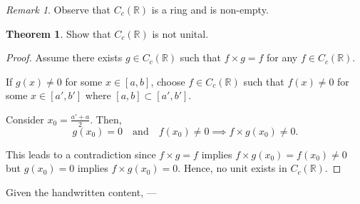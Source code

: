 \documentclass[11pt]{article}
\theoremstyle{definition}
\newtheorem{theorem}{Theorem}[section]
\theoremstyle{remark}
\newtheorem{remark}{Remark}[section]
\begin{document}
\begin{remark}\label{rem:ring}
Observe that $C_c(\mathbb{R})$ is a ring and is non-empty.
\end{remark}

\begin{theorem}\label{thm:nonunit}
Show that $C_c(\mathbb{R})$ is not unital.
\end{theorem}

\begin{proof}
Assume there exists $g \in C_c(\mathbb{R})$ such that $f \times g = f$ for any $f \in C_c(\mathbb{R})$.

If $g(x) \neq 0$ for some $x \in [a, b]$, choose $f \in C_c(\mathbb{R})$ such that $f(x) \neq 0$ for some $x \in [a', b']$ where $[a, b] \subset [a', b']$.

Consider $x_0 = \frac{a' + a}{2}$. Then,
\[
g(x_0) = 0 \quad \text{and} \quad f(x_0) \neq 0 \implies f \times g(x_0) \neq 0.
\]

This leads to a contradiction since $f \times g = f$ implies $f \times g(x_0) = f(x_0) \neq 0$ but $g(x_0) = 0$ implies $f \times g(x_0) = 0$. Hence, no unit exists in $C_c(\mathbb{R})$.
\end{proof}

Given the handwritten content, 
---
\end{document}
